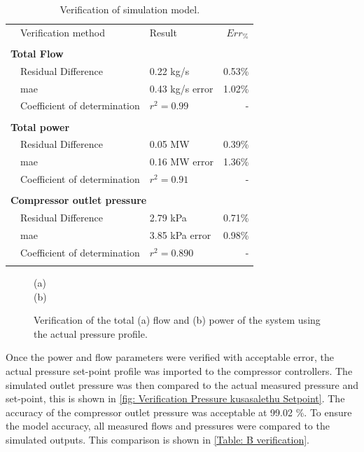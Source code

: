   \begin{table}[h!]
 	\label{Kus verification table}
 	\centering
 	\begin{tabular}{p{0.5cm}p{8cm}p{5cm}r}
 		\hline
 		&Verification method & Result & $Err_{\%}$\\
 		\hhline{====}
 		\\ \multicolumn{4}{l}{\textbf{ Total Flow}}\\
 		&Residual Difference          & 0.22 kg/s  & 0.53\% \\
 		&\gls{mae} 					 & 0.43 kg/s error & 1.02\% \\
 		&Coefficient of determination & $r^2 =0.99$   & -\\ 
 		\\ \multicolumn{4}{l}{\textbf{ Total power}}\\
 		&Residual Difference          & 0.05 MW  & 0.39\% \\
 		&\gls{mae} 					 & 0.16 MW error & 1.36\% \\
 		&Coefficient of determination & $r^2 =0.91$   & -\\ 
 		\\ \multicolumn{4}{l}{\textbf{ Compressor outlet pressure}}\\
 		&Residual Difference          & 2.79 kPa   & 0.71\% \\
 		&\gls{mae} 					 & 3.85 kPa error & 0.98\% \\
 		&Coefficient of determination & $r^2 =0.890$   & -\\
 		\\ 	\hline
 	\end{tabular} 
 	\caption{Verification of simulation model.}
 \end{table}

	\begin{figure}[h]
		\centering
		
		(a)\\
		
		(b)\\
		\caption{Verification of the total (a) flow and (b) power of the system using the actual pressure profile.}
		\label{fig: Verification Power kusasalethu}
	\end{figure}

	Once the power and flow parameters were verified with acceptable error, the actual pressure set-point profile was imported to the compressor controllers. The simulated outlet pressure was then compared to the actual measured pressure and set-point, this is shown in \cref{fig: Verification Pressure kusasalethu Setpoint}. The accuracy of the compressor outlet pressure was acceptable at 99.02 \%. To ensure the model accuracy, all measured flows and pressures were compared to the simulated outputs. This comparison is shown in \cref{Table: B verification}.

